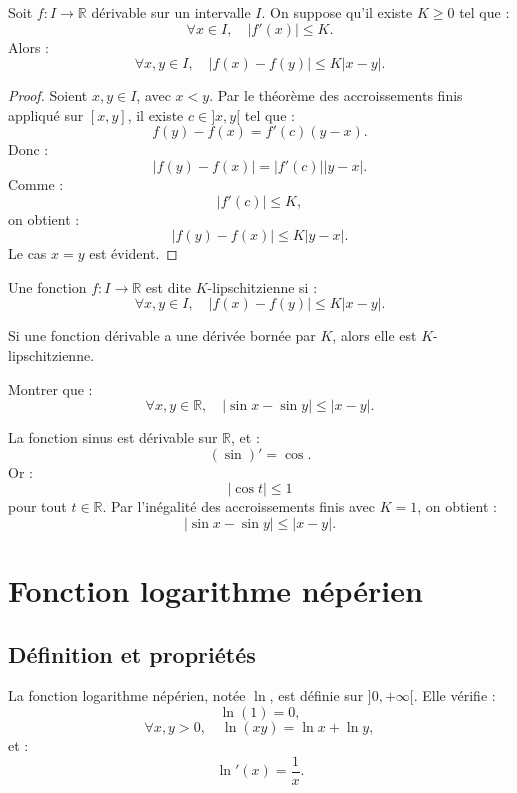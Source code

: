 \documentclass[11pt,a4paper]{article}
\newcommand{\R}{\mathbb R}
\begin{document}
\begin{theorembox}
Soit \(f:I\to\R\) dérivable sur un intervalle \(I\).  
On suppose qu'il existe \(K\geq0\) tel que :
\[
\forall x\in I,\quad |f'(x)|\leq K.
\]
Alors :
\[
\forall x,y\in I,\quad |f(x)-f(y)|\leq K|x-y|.
\]
\end{theorembox}

\begin{proof}
Soient \(x,y\in I\), avec \(x<y\).  
Par le théorème des accroissements finis appliqué sur \([x,y]\), il existe \(c\in]x,y[\) tel que :
\[
f(y)-f(x)=f'(c)(y-x).
\]
Donc :
\[
|f(y)-f(x)|=|f'(c)||y-x|.
\]
Comme :
\[
|f'(c)|\leq K,
\]
on obtient :
\[
|f(y)-f(x)|\leq K|y-x|.
\]
Le cas \(x=y\) est évident.
\end{proof}

\begin{definitionbox}
Une fonction \(f:I\to\R\) est dite \(K\)-lipschitzienne si :
\[
\forall x,y\in I,\quad |f(x)-f(y)|\leq K|x-y|.
\]
\end{definitionbox}

\begin{retenirbox}
Si une fonction dérivable a une dérivée bornée par \(K\), alors elle est \(K\)-lipschitzienne.
\end{retenirbox}

\begin{exercicebox}
Montrer que :
\[
\forall x,y\in\R,\quad |\sin x-\sin y|\leq |x-y|.
\]
\end{exercicebox}

\begin{correctionbox}
La fonction sinus est dérivable sur \(\R\), et :
\[
(\sin)'=\cos.
\]
Or :
\[
|\cos t|\leq1
\]
pour tout \(t\in\R\).  
Par l'inégalité des accroissements finis avec \(K=1\), on obtient :
\[
|\sin x-\sin y|\leq |x-y|.
\]
\end{correctionbox}

\section{Fonction logarithme népérien}

\subsection{Définition et propriétés}

\begin{definitionbox}
La fonction logarithme népérien, notée \(\ln\), est définie sur \(]0,+\infty[\).  
Elle vérifie :
\[
\ln(1)=0,
\]
\[
\forall x,y>0,\quad \ln(xy)=\ln x+\ln y,
\]
et :
\[
\ln'(x)=\frac1x.
\]
\end{definitionbox}
\end{document}
